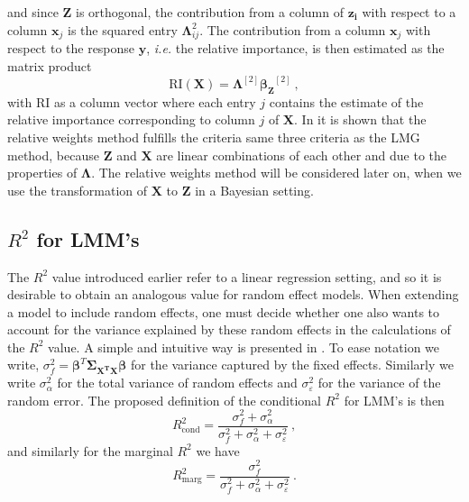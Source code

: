 and since $\mathbf{Z}$ is orthogonal, the contribution from a column of $\mathbf{z_i}$ with respect to a column $\mathbf{x}_j$ is the squared entry $\boldsymbol{\Lambda}_{ij}^2$.
The contribution from a column $\mathbf{x}_j$ with respect to the response $\mathbf{y}$, \textit{i.e.} the relative importance, is then estimated as the matrix product \citep{johnson_relative_weights}
\begin{equation}
    \label{eq:RI_lambda}
    \text{RI}(\mathbf{X}) = \boldsymbol{\Lambda}^{[2]} \boldsymbol{\beta_Z}^{[2]} \ , 
\end{equation}
with $\text{RI}$ as a column vector where each entry $j$ contains the estimate of the relative importance corresponding to column $j$ of $\mathbf{X}$.
In \citet[section 2.5.3]{matre} it is shown that the relative weights method fulfills the criteria same three criteria as the LMG method, because $\mathbf{Z}$ and $\mathbf{X}$ are linear combinations of each other and due to the properties of $\boldsymbol{\Lambda}$.
The relative weights method will be considered later on, when we use the transformation of $\mathbf{X}$ to $\mathbf{Z}$ in a Bayesian setting.


\subsection{$R^2$ for LMM's}
\label{sec:R2_LMM}
The $R^2$ value introduced earlier refer to a linear regression setting, and so it is desirable to obtain an analogous value for random effect models.
When extending a model to include random effects, one must decide whether one also wants to account for the variance explained by these random effects in the calculations of the $R^2$ value.
A simple and intuitive way is presented in \citet{nakagawa2013general}. To ease notation we write, $\sigma^2_f = \boldsymbol{\beta}^T \boldsymbol{\Sigma_{\mathbf{X^TX}}}\boldsymbol{\beta}$ for the variance captured by the fixed effects. Similarly we write $\sigma_{\alpha}^2$ for the total variance of random effects and $\sigma^2_{\varepsilon}$ for the variance of the random error. 
The proposed definition of the conditional $R^2$ for LMM's is then
\begin{equation}
    R^2_{\text{cond}} = \frac{\sigma^2_f + \sigma^2_{\alpha}}{\sigma^2_f + \sigma^2_{\alpha} + \sigma^2_{\varepsilon}} \ ,
    \label{eq:R2_LMM_conditional}
\end{equation}
and similarly for the marginal $R^2$ we have
\begin{equation}
    R^2_{\text{marg}} = \frac{\sigma^2_f}{\sigma^2_f + \sigma^2_{\alpha} + \sigma^2_{\varepsilon}} \ .
    \label{eq:R2_LMM_marginal}
\end{equation}

